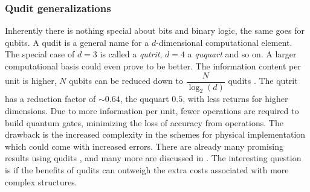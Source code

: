 \subsubsection{Qudit generalizations}
Inherently there is nothing special about bits and binary logic, the same goes for qubits.  A qudit is a general name for a  $d$-dimensional computational element. The special case of $d = 3$ is called a \textit{qutrit}, $d = 4$ a \textit{ququart} and so on. A larger computational basis could even prove to be better. The information content per unit is higher, $N$ qubits can be reduced down to $\dfrac{N}{\log_2(d)}$ qudits  \cite{info_qudit}. The qutrit has a reduction factor of $\sim 0.64$, the ququart $0.5$, with less returns for higher dimensions. Due to more information per unit, fewer operations are required to build quantum gates, minimizing the loss of accuracy from operations. The drawback is the increased complexity in the schemes for physical implementation which could come with increased errors. There are already many promising results using qudits \cite{qutrit1,qudit2,qudit3}, and many more are discussed in \cite{qudit}. The interesting question is if the benefits of qudits can outweigh the extra costs associated with more complex structures.

